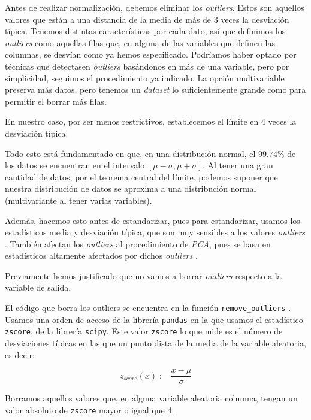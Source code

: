 \documentclass[11pt]{article}
\begin{document}
Antes de realizar normalización, debemos eliminar los \emph{outliers}. Estos son aquellos valores que están a una distancia de la media de más de 3 veces la desviación típica. Tenemos distintas características por cada dato, así que definimos los \emph{outliers} como aquellas filas que, en alguna de las variables que definen las columnas, se desvían como ya hemos especificado. Podríamos haber optado por técnicas que detectasen \emph{outliers} basándonos en más de una variable, pero por simplicidad, seguimos el procedimiento ya indicado. La opción multivariable preserva más datos, pero tenemos un \emph{dataset} lo suficientemente grande como para permitir el borrar más filas.

En nuestro caso, por ser menos restrictivos, establecemos el límite en 4 veces la desviación típica.

Todo esto está fundamentado en que, en una distribución normal, el $99.74\%$ de los datos se encuentran en el intervalo $[\mu - \sigma, \mu + \sigma]$. Al tener una gran cantidad de datos, por el teorema central del límite, podemos suponer que nuestra distribución de datos se aproxima a una distribución normal (multivariante al tener varias variables).

Además, hacemos esto antes de estandarizar, pues para estandarizar, usamos los estadísticos media y desviación típica, que son muy sensibles a los valores \emph{outliers} \cite{scikit_scale_with_outliers:online}. También afectan los \emph{outliers} al procedimiento de \emph{PCA}, pues se basa en estadísticos altamente afectados por dichos \emph{outliers} \cite{pca_medium:online}.

Previamente hemos justificado que no vamos a borrar \emph{outliers} respecto a la variable de salida.

El código que borra los outliers se encuentra en la función \lstinline{remove_outliers} \footnotemark. Usamos una orden de acceso de la librería \lstinline{pandas} en la que usamos el estadístico \lstinline{zscore}, de la librería \lstinline{scipy}. Este valor \lstinline{zscore} lo que mide es el número de desviaciones típicas en las que un punto dista de la media de la variable aleatoria, es decir:


$$z_{score}(x) := \frac{x - \mu}{\sigma}$$

Borramos aquellos valores que, en alguna variable aleatoria columna, tengan un valor absoluto de \lstinline{zscore} mayor o igual que 4.
\end{document}
